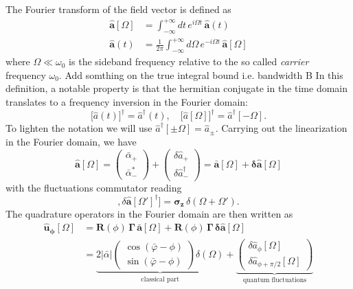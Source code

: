 The Fourier transform of the field vector is defined as
\begin{equation}
  \begin{split}
    \mathbf{\hat{a}}[\Omega] &=\int_{-\infty}^{+\infty}  dt \, e^{i\Omega t} \, \mathbf{\hat{a}}(t)\\
\mathbf{\hat{a}}(t) &= \frac{1}{2\pi}\int_{-\infty}^{+\infty}  d\Omega \, e^{-i\Omega t} \, \mathbf{\hat{a}}[\Omega]
  \end{split}
\end{equation}
where $\Omega \ll \omega_0$ is the sideband frequency relative to the so called \textit{carrier} frequency $\omega_0$. \color{red}  Add somthing on the true integral bound i.e. bandwidth B  \color{black}In this definition, a notable property is that the hermitian conjugate in the time domain translates to a frequency inversion in the Fourier domain:
\begin{equation}
   \Big[\hat{a}(t)\Big]^{\dagger} = \hat{a}^\dagger(t),  \quad
   \Big[\hat{a}[\Omega]\Big]^{\dagger}  = \hat{a}^\dagger[-\Omega].
\end{equation}
To lighten the notation we will use $\hat{a}^\dagger[\pm\Omega]=\hat{a}_\pm$. Carrying out the linearization in the Fourier domain, we have
\begin{equation}
      \mathbf{\hat{a}}[\Omega] =\begin{pmatrix} \bar{\alpha}_+ \\ \bar{\alpha}^*_- \end{pmatrix} + \begin{pmatrix} \delta\hat{a}_+ \\ \delta\hat{a}^\dagger_- \end{pmatrix} = \mathbf{\bar{a}}[\Omega]+ \mathbf{\delta \hat{a}}[\Omega]
\end{equation}
with the fluctuations commutator reading
\begin{equation}
  [\delta \mathbf{\hat{a}}[\Omega], \delta \mathbf{\hat{a}}[\Omega']^{\dagger}] = \mathbf{\sigma_z} \, \delta(\Omega + \Omega').
\end{equation}
The quadrature operators in the Fourier domain are then written as 
\begin{equation}
  \begin{split}
      \mathbf{\hat{u}_\phi}[\Omega] & = \mathbf{R}(\phi) \, \mathbf{\Gamma} \,\mathbf{\bar{a}}[\Omega] + \mathbf{R}(\phi) \, \mathbf{\Gamma} \, \mathbf{\delta \hat{a}}[\Omega] \\
      & = \underbrace{2|\bar{\alpha}| \begin{pmatrix}
  \cos(\bar{\varphi}-\phi) \\[2pt]
  \sin(\bar{\varphi}-\phi)
\end{pmatrix} \delta(\Omega)}_{\text{classical part}} +
\underbrace{\begin{pmatrix}
  \delta \hat{a}_\phi[\Omega] \\[2pt]
\delta \hat{a}_{\phi+\pi/2}[\Omega] \end{pmatrix}}_{\text{quantum fluctuations}}
  \end{split}
\end{equation}
